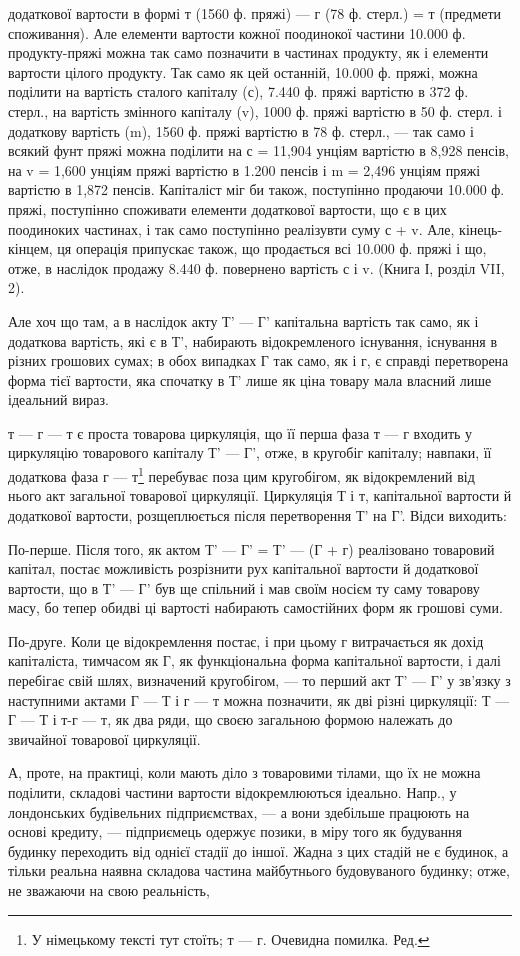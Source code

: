 додаткової вартости в формі т (1560 ф. пряжі) — г (78 ф. стерл.) = т
(предмети споживання). Але елементи вартости кожної поодинокої частини
10.000  ф. продукту-пряжі можна так само позначити в частинах продукту,
як і елементи вартости цілого продукту. Так само як цей останній, 10.000 ф. пряжі, можна поділити на
вартість сталого капіталу (с), 7.440 ф.
пряжі вартістю в 372 ф. стерл., на вартість змінного капіталу (v), 1000 ф.
пряжі вартістю в 50 ф. стерл. і додаткову вартість (m), 1560 ф. пряжі
вартістю в 78 ф. стерл., — так само і всякий фунт пряжі можна поділити
на с = 11,904 унціям вартістю в 8,928 пенсів, на v = 1,600 унціям пряжі
вартістю в 1.200 пенсів і m = 2,496 унціям пряжі вартістю в 1,872 пенсів.
Капіталіст міг би також, поступінно продаючи 10.000 ф. пряжі, поступінно
споживати елементи додаткової вартости, що є в цих поодиноких частинах,
і так само поступінно реалізувти суму с + v. Але, кінець-кінцем, ця операція
припускає також, що продається всі 10.000 ф. пряжі і що, отже, в наслідок
продажу 8.440 ф. повернено вартість с і v. (Книга І, розділ VII, 2).

Але хоч що там, а в наслідок акту Т' — Г' капітальна вартість так
само, як і додаткова вартість, які є в Т', набирають відокремленого
існування, існування в різних грошових сумах; в обох випадках Г так
само, як і г, є справді перетворена форма тієї вартости, яка спочатку
в Т' лише як ціна товару мала власний лише ідеальний вираз.

т — г — т є проста товарова циркуляція, що її перша фаза т — г входить
у циркуляцію товарового капіталу Т' — Г', отже, в кругобіг капіталу;
навпаки, її додаткова фаза г — т\footnote*{
У німецькому тексті тут стоїть; т — г. Очевидна помилка. Ред.
} перебуває поза цим кругобігом, як
відокремлений від нього акт загальної товарової циркуляції. Циркуляція
Т і т, капітальної вартости й додаткової вартости, розщеплюється після
перетворення Т' на Г'. Відси виходить:

По-перше. Після того, як актом Т' — Г' = Т' — (Г + г) реалізовано
товаровий капітал, постає можливість розрізнити рух капітальної
вартости й додаткової вартости, що в Т' — Г' був ще спільний і мав своїм
носієм ту саму товарову масу, бо тепер обидві ці вартості набирають
самостійних форм як грошові суми.

По-друге. Коли це відокремлення постає, і при цьому г витрачається
як дохід капіталіста, тимчасом як Г, як функціональна форма капітальної
вартости, і далі перебігає свій шлях, визначений кругобігом, — то перший
акт Т' — Г' у зв’язку з наступними актами Г — Т і г — т можна позначити,
як дві різні циркуляції: Т — Г — Т і т-г — т, як два ряди, що своєю
загальною формою належать до звичайної товарової циркуляції.

А, проте, на практиці, коли мають діло з товаровими тілами, що
їх не можна поділити, складові частини вартости відокремлюються
ідеально. Напр., у лондонських будівельних підприємствах, — а вони здебільше
працюють на основі кредиту, — підприємець одержує позики,
в міру того як будування будинку переходить від однієї стадії до іншої.
Жадна з цих стадій не є будинок, а тільки реальна наявна складова частина
майбутнього будовуваного будинку; отже, не зважаючи на свою реальність,